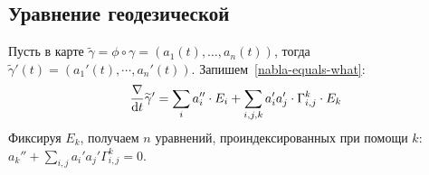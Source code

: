 \documentclass[a4paper]{report}
\begin{document}
    \subsection{Уравнение геодезической}
    Пусть в карте $\tilde{\gamma} = \phi \circ \gamma = (a_1(t), \dots, a_n(t))$, тогда $\tilde{\gamma}'(t) = (a_1'(t), \cdots, a_n'(t))$.
    Запишем~\eqref{nabla-equals-what}:\[\frac{\nabla}{\operatorname{d}\! t}\widetilde{\gamma}' = \sum\limits_{i}a_i'' \cdot E_i + \sum\limits_{i,j,k}a_i' a_j' \cdot \Gamma_{i,j}^{k} \cdot E_k\]
    Фиксируя $E_k$, получаем $n$ уравнений, проиндексированных при помощи $k$: $a_k'' + \sum\limits_{i,j}a_i' a_j' \Gamma_{i,j}^{k} = 0$.

\end{document}
